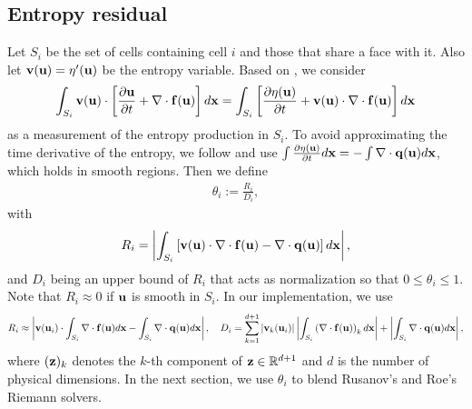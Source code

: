 \documentclass[preprint, 11pt]{article}
\newcommand{\bff}{{\bf f}}
\newcommand{\bfu}{{\bf u}}
\newcommand{\bfv}{{\bf v}}
\newcommand{\bfq}{{\bf q}}
\newcommand{\bfx}{{\bf x}}
\begin{document}
\subsection{Entropy residual}
Let $S_i$ be the set of cells containing cell $i$ and those that share a face with it.
Also let $\bfv(\bfu)=\eta^\prime(\bfu)$ be the entropy variable.
Based on \cite{guermond2011entropy}, we consider
\begin{align}\label{ent_residual}
  \int_{S_i} \bfv(\bfu) \cdot \left[ \frac{\partial \bfu}{\partial t} + \nabla\cdot \bff(\bfu)\right]d\bfx
  =\int_{S_i} \left[\frac{\partial \eta(\bfu)}{\partial t} + \bfv(\bfu) \cdot \nabla\cdot \bff(\bfu)\right] d\bfx
\end{align}
as a measurement of the entropy production in $S_i$.
To avoid approximating the time derivative of the entropy, we follow
\cite{guermond2018second, guermond2018well} and use
$\int \frac{\partial\eta(\bfu)}{\partial t}d\bfx=-\int \nabla\cdot\bfq(\bfu) d\bfx$,
which holds in smooth regions. Then we define
\begin{align}\label{Ri}
  \theta_i := \frac{R_i}{D_i},
\end{align}
with
\begin{align*}
  R_i=
  \left|\int_{S_i} \left[\bfv(\bfu) \cdot \nabla\cdot \bff(\bfu) - \nabla\cdot\bfq(\bfu) \right] d\bfx\right|,
\end{align*}
and $D_i$ being an upper bound of $R_i$ that acts as normalization so that $0\leq \theta_i\leq 1$.
Note that $R_i\approx 0$ if $\bfu$ is smooth in $S_i$.
In our implementation, we use
\begin{align*}
  R_i\approx \left|\bfv(\bfu_i)\cdot \int_{S_i}\nabla\cdot \bff(\bfu)d\bfx
  -\int_{S_i}\nabla\cdot\bfq(\bfu) d\bfx\right|,
  \quad
  D_i = \sum_{k=1}^{d+1}|\bfv_k(\bfu_i)|\left|\int_{S_i}\left(\nabla\cdot\bff(\bfu)\right)_kd\bfx\right|
  +\left|\int_{S_i}\nabla\cdot\bfq(\bfu)d\bfx\right|,
\end{align*}
where $({\bf z})_k$ denotes the $k$-th component of ${\bf z}\in\mathbb{R}^{d+1}$ and $d$ is the number of physical
dimensions. In the next section, we use $\theta_i$ to blend Rusanov's and Roe's Riemann solvers.
\end{document}

